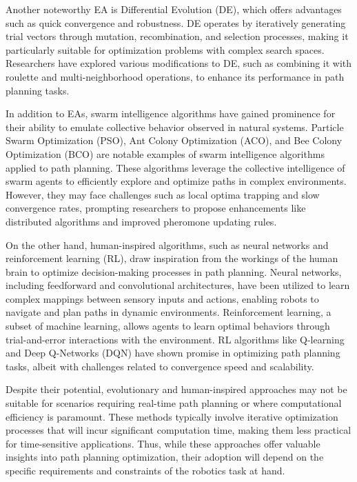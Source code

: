 \vspace*{6mm}


Another noteworthy EA is Differential Evolution (DE), which offers advantages such as quick convergence and robustness. DE operates by iteratively generating trial vectors through mutation, recombination, and selection processes, making it particularly suitable for optimization problems with complex search spaces. Researchers have explored various modifications to DE, such as combining it with roulette and multi-neighborhood operations, to enhance its performance in path planning tasks.

\vspace*{6mm}


In addition to EAs, swarm intelligence algorithms have gained prominence for their ability to emulate collective behavior observed in natural systems. Particle Swarm Optimization (PSO), Ant Colony Optimization (ACO), and Bee Colony Optimization (BCO) are notable examples of swarm intelligence algorithms applied to path planning. These algorithms leverage the collective intelligence of swarm agents to efficiently explore and optimize paths in complex environments. However, they may face challenges such as local optima trapping and slow convergence rates, prompting researchers to propose enhancements like distributed algorithms and improved pheromone updating rules.

\vspace*{6mm}


On the other hand, human-inspired algorithms, such as neural networks and reinforcement learning (RL), draw inspiration from the workings of the human brain to optimize decision-making processes in path planning. Neural networks, including feedforward and convolutional architectures, have been utilized to learn complex mappings between sensory inputs and actions, enabling robots to navigate and plan paths in dynamic environments. Reinforcement learning, a subset of machine learning, allows agents to learn optimal behaviors through trial-and-error interactions with the environment. RL algorithms like Q-learning and Deep Q-Networks (DQN) have shown promise in optimizing path planning tasks, albeit with challenges related to convergence speed and scalability.

\vspace*{6mm}


Despite their potential, evolutionary and human-inspired approaches may not be suitable for scenarios requiring real-time path planning or where computational efficiency is paramount. These methods typically involve iterative optimization processes that will incur significant computation time, making them less practical for time-sensitive applications. Thus, while these approaches offer valuable insights into path planning optimization, their adoption will depend on the specific requirements and constraints of the robotics task at hand.



